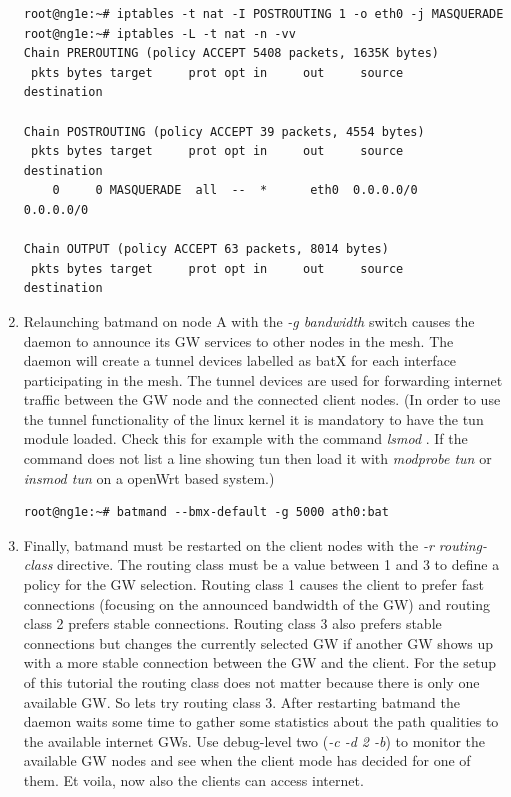 \documentclass[11pt]{article}
\begin{document}
\begin{enumerate}
\begin{small} \begin{verbatim}
root@ng1e:~# iptables -t nat -I POSTROUTING 1 -o eth0 -j MASQUERADE
root@ng1e:~# iptables -L -t nat -n -vv
Chain PREROUTING (policy ACCEPT 5408 packets, 1635K bytes)
 pkts bytes target     prot opt in     out     source               destination

Chain POSTROUTING (policy ACCEPT 39 packets, 4554 bytes)
 pkts bytes target     prot opt in     out     source               destination
    0     0 MASQUERADE  all  --  *      eth0  0.0.0.0/0            0.0.0.0/0

Chain OUTPUT (policy ACCEPT 63 packets, 8014 bytes)
 pkts bytes target     prot opt in     out     source               destination
\end{verbatim} \end{small}

\item Relaunching batmand on node A with the \emph{-g bandwidth } switch causes the daemon to announce its GW services to other nodes in the mesh. The daemon will create a tunnel devices labelled as batX for each interface participating in the mesh. The tunnel devices are used for forwarding internet traffic between the GW node and the connected client nodes. (In order to use the tunnel functionality of the linux kernel it is mandatory to have the tun module loaded. Check this for example with the command \emph{lsmod }. If the command does not list a line showing tun then load it with \emph{modprobe tun} or \emph{insmod tun} on a openWrt based system.)


\begin{small} \begin{verbatim}
root@ng1e:~# batmand --bmx-default -g 5000 ath0:bat
\end{verbatim} \end{small}


\item Finally, batmand must be restarted on the client nodes with the \emph{-r routing-class} directive. 
The routing class must be a value between 1 and 3 to define a policy for the GW selection. 
Routing class 1 causes the client to prefer fast connections (focusing on the announced bandwidth of the GW) and routing class 2 prefers stable connections. 
Routing class 3 also prefers stable connections but changes the currently selected GW if another GW shows up with a more stable connection between the GW and the client.
For the setup of this tutorial the routing class does not matter because there is only one available GW. So lets try routing class 3.
After restarting batmand the daemon waits some time to gather some statistics about the path qualities to the available internet GWs. Use debug-level two (\emph{-c -d 2 -b}) to monitor the available GW nodes and see when the client mode has decided for one of them. 
Et voila, now also the clients can access internet.


\end{enumerate}
\end{document}
